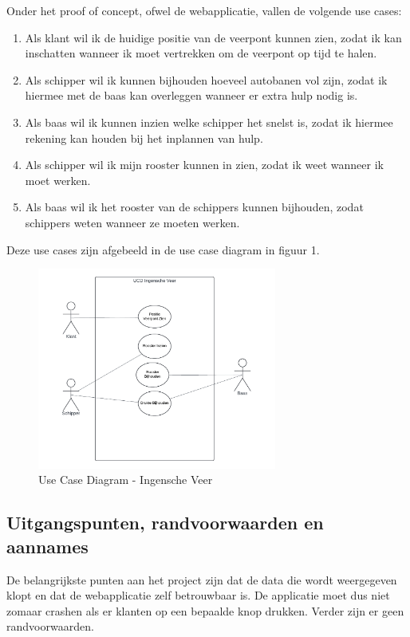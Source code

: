 \documentclass{article}
\begin{document}
Onder het proof of concept, ofwel de webapplicatie, vallen de volgende use cases:
\begin{enumerate}
    \item Als klant wil ik de huidige positie van de veerpont kunnen zien, zodat ik kan inschatten wanneer ik moet vertrekken om de veerpont op tijd te halen.
    \item Als schipper wil ik kunnen bijhouden hoeveel autobanen vol zijn, zodat ik hiermee met de baas kan overleggen wanneer er extra hulp nodig is.
    \item Als baas wil ik kunnen inzien welke schipper het snelst is, zodat ik hiermee rekening kan houden bij het inplannen van hulp.
    \item Als schipper wil ik mijn rooster kunnen in zien, zodat ik weet wanneer ik moet werken.
    \item Als baas wil ik het rooster van de schippers kunnen bijhouden, zodat schippers weten wanneer ze moeten werken.
\end{enumerate}
\par\smallskip
Deze use cases zijn afgebeeld in de use case diagram in figuur 1.
\begin{figure}[h]
    \centering
    \label{fig:ucd}
    \includegraphics[width=0.7\textwidth]{images/iv_ucd.png}
    \caption{Use Case Diagram - Ingensche Veer}
\end{figure}

\subsection{Uitgangspunten, randvoorwaarden en aannames}
De belangrijkste punten aan het project zijn dat de data die wordt weergegeven klopt en dat de webapplicatie zelf betrouwbaar is. De applicatie moet dus niet zomaar crashen als er klanten op een bepaalde knop drukken.
Verder zijn er geen randvoorwaarden.
\end{document}
